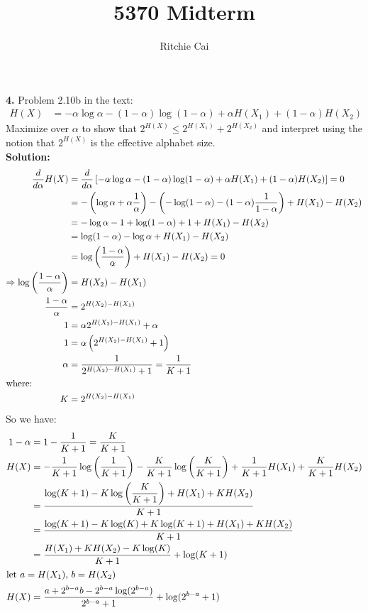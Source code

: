\documentclass{assignment}
\title{5370 Midterm}
\author{Ritchie Cai}
\begin{document}
\textbf{4.} Problem 2.10b in the text:\\
\begin{align*}
  H(X) & = -\alpha\log\alpha - (1 - \alpha)\log (1- \alpha) + \alpha H(X_1) + (1 - \alpha) H(X_2)
\end{align*}
Maximize over $\alpha$ to show that $2^{H(X)}\leq 2^{H(X_1)} + 2^{H(X_2) }$ and interpret using the notion that $2^{H(X)}$ is the effective alphabet size.\\

\textbf{Solution:} \\
\begin{align*}
  \dfrac{d}{d\alpha} H(X)
  & = \dfrac{d}{d\alpha}\left[ -\alpha\log\alpha - (1 - \alpha)\log (1- \alpha) + \alpha H(X_1) + (1 - \alpha) H(X_2)\right]
    = 0 \\
  & = -\left(\log \alpha + \alpha \dfrac{1}{\alpha}\right) - \left( - \log(1-\alpha) - (1-\alpha)\dfrac{1}{1-\alpha}\right)
      + H(X_1) - H(X_2)\\
  & =  -\log\alpha - 1 + \log(1-\alpha) + 1 + H(X_1) - H(X_2) \\
  & =  \log(1-\alpha) - \log\alpha + H(X_1) - H(X_2) \\
  & = \log\left( \dfrac{1 -\alpha}{\alpha} \right) + H(X_1) - H(X_2) = 0\\
  \Rightarrow \log\left( \dfrac{1 -\alpha}{\alpha} \right) & = H(X_2) - H(X_1) \\
  \dfrac{1 - \alpha}{\alpha} & = 2^{H(X_2) - H(X_1)} \\
  1 & = \alpha 2^{H(X_2) - H(X_1)} + \alpha\\
  1 & = \alpha \left( 2^{H(X_2) - H(X_1)} + 1 \right) \\
  \alpha & = \dfrac{1}{2^{H(X_2) - H(X_1)} + 1} = \dfrac{1}{K + 1} \\
  \shortintertext{where:}
  K & = 2^{H(X_2) - H(X_1)}
\end{align*}
So we have:
\begin{align*}
  1 - \alpha & = 1 - \dfrac{1}{K + 1} = \dfrac{K}{K + 1} \\
  H(X) & = - \dfrac{1}{K + 1} \log\left( \dfrac{1}{K + 1} \right) - \dfrac{K}{K + 1}\log\left( \dfrac{K}{K + 1} \right)
           + \dfrac{1}{K + 1} H(X_1) + \dfrac{K}{K + 1}H(X_2) \\
             & = \dfrac{\log(K + 1) - K\log\left( \dfrac{K}{K + 1} \right) + H(X_1) + K H(X_2)}{K + 1} \\
             & = \dfrac{\log(K + 1) - K\log(K) + K\log(K+1) + H(X_1) + K H(X_2)}{K + 1} \\
             & = \dfrac{H(X_1) +K H(X_2) - K\log(K)}{K+1} + \log(K+1) \\
  \shortintertext{let $a=H(X_1)$, $b=H(X_2)$}
  H(X) & = \dfrac{a +2^{b - a} b - 2^{b - a}\log(2^{b - a})}{2^{b - a}+1} + \log(2^{b - a}+1)
\end{align*}
\end{document}
